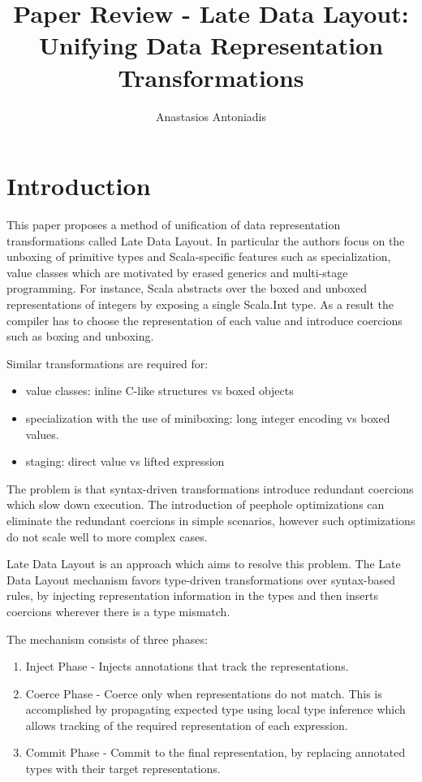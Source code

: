 \documentclass{article} \usepackage{hyperref} \usepackage{graphicx}
\begin{document}
\title{Paper Review - Late Data Layout: Unifying Data Representation Transformations} \author{Anastasios Antoniadis}

\maketitle

\section{Introduction}

This paper proposes a method of unification of data representation
transformations called Late Data Layout. In particular the authors
focus on the unboxing of primitive types and Scala-specific features
such as specialization, value classes which are motivated by erased
generics and multi-stage programming. For instance, Scala abstracts
over the boxed and unboxed representations of integers by exposing a
single Scala.Int type. As a result the compiler has to choose the
representation of each value and introduce coercions such as boxing
and unboxing.

Similar transformations are required for:
\begin{itemize}
\item value classes: inline C-like structures vs boxed objects
\item specialization with the use of miniboxing: long integer encoding vs
boxed values.
\item staging: direct value vs lifted expression
\end{itemize}
The problem is that syntax-driven transformations introduce redundant
coercions which slow down execution. The introduction of peephole
optimizations can eliminate the redundant coercions in simple
scenarios, however such optimizations do not scale well to more
complex cases.

Late Data Layout is an approach which aims to resolve this
problem. The Late Data Layout mechanism favors type-driven
transformations over syntax-based rules, by injecting representation
information in the types and then inserts coercions wherever there is
a type mismatch.

The mechanism consists of three phases:
\begin{enumerate}
\item Inject Phase - Injects annotations that track the
representations.
\item Coerce Phase - Coerce only when representations do not
match. This is accomplished by propagating expected type using local
type inference which allows tracking of the required representation of
each expression.
\item Commit Phase - Commit to the final representation, by replacing
annotated types with their target representations.
\end{enumerate}
\end{document}
